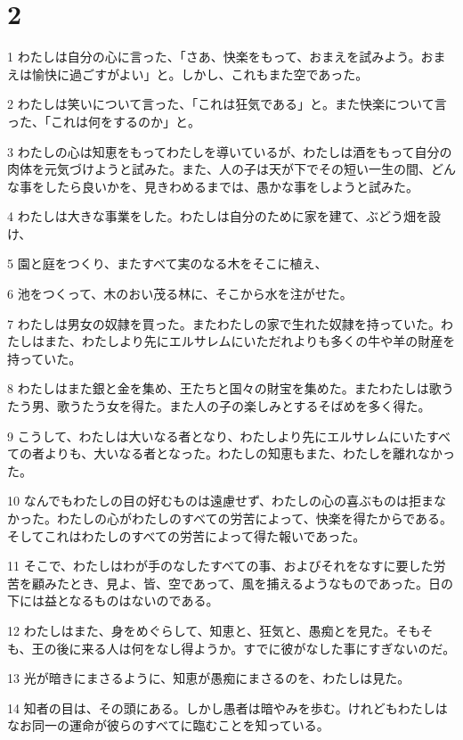\chapter{2}

\par 1 わたしは自分の心に言った、「さあ、快楽をもって、おまえを試みよう。おまえは愉快に過ごすがよい」と。しかし、これもまた空であった。
\par 2 わたしは笑いについて言った、「これは狂気である」と。また快楽について言った、「これは何をするのか」と。
\par 3 わたしの心は知恵をもってわたしを導いているが、わたしは酒をもって自分の肉体を元気づけようと試みた。また、人の子は天が下でその短い一生の間、どんな事をしたら良いかを、見きわめるまでは、愚かな事をしようと試みた。
\par 4 わたしは大きな事業をした。わたしは自分のために家を建て、ぶどう畑を設け、
\par 5 園と庭をつくり、またすべて実のなる木をそこに植え、
\par 6 池をつくって、木のおい茂る林に、そこから水を注がせた。
\par 7 わたしは男女の奴隷を買った。またわたしの家で生れた奴隷を持っていた。わたしはまた、わたしより先にエルサレムにいただれよりも多くの牛や羊の財産を持っていた。
\par 8 わたしはまた銀と金を集め、王たちと国々の財宝を集めた。またわたしは歌うたう男、歌うたう女を得た。また人の子の楽しみとするそばめを多く得た。
\par 9 こうして、わたしは大いなる者となり、わたしより先にエルサレムにいたすべての者よりも、大いなる者となった。わたしの知恵もまた、わたしを離れなかった。
\par 10 なんでもわたしの目の好むものは遠慮せず、わたしの心の喜ぶものは拒まなかった。わたしの心がわたしのすべての労苦によって、快楽を得たからである。そしてこれはわたしのすべての労苦によって得た報いであった。
\par 11 そこで、わたしはわが手のなしたすべての事、およびそれをなすに要した労苦を顧みたとき、見よ、皆、空であって、風を捕えるようなものであった。日の下には益となるものはないのである。
\par 12 わたしはまた、身をめぐらして、知恵と、狂気と、愚痴とを見た。そもそも、王の後に来る人は何をなし得ようか。すでに彼がなした事にすぎないのだ。
\par 13 光が暗きにまさるように、知恵が愚痴にまさるのを、わたしは見た。
\par 14 知者の目は、その頭にある。しかし愚者は暗やみを歩む。けれどもわたしはなお同一の運命が彼らのすべてに臨むことを知っている。
